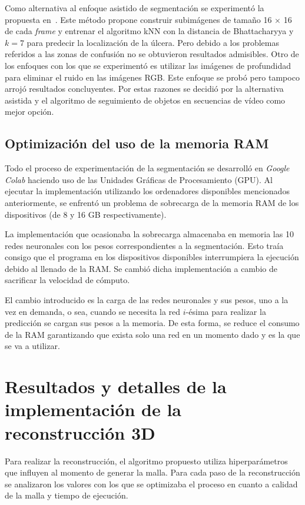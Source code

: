 Como alternativa al enfoque asistido de segmentación se experimentó la  propuesta en~\cite{filko2018wound}. Este método propone construir subimágenes de tamaño 16 $\times$ 16 de cada \textit{frame} y entrenar el algoritmo kNN con la distancia de Bhattacharyya y $k = 7$ para predecir la localización de la úlcera. Pero debido a los problemas referidos a las zonas de confusión no se obtuvieron resultados admisibles. Otro de los enfoques con los que se experimentó es utilizar las imágenes de profundidad para eliminar el ruido en las imágenes RGB. Este enfoque se probó pero tampoco arrojó resultados concluyentes. Por estas razones se decidió por la alternativa asistida y el algoritmo de seguimiento de objetos en secuencias de vídeo como mejor opción.

\subsection{Optimización del uso de la memoria RAM}

Todo el proceso de experimentación de la segmentación se desarrolló en \textit{Google Colab} haciendo uso de las Unidades Gráficas de Procesamiento (GPU). Al ejecutar la implementación utilizando los ordenadores disponibles mencionados anteriormente, se enfrentó un problema de sobrecarga de la memoria RAM de los dispositivos (de 8 y 16 GB respectivamente).

La implementación que ocasionaba la sobrecarga almacenaba en memoria las 10 redes neuronales con los pesos correspondientes a la segmentación. Esto traía consigo que el programa en los dispositivos disponibles interrumpiera la ejecución debido al llenado de la RAM. Se cambió dicha implementación a cambio de sacrificar la velocidad de cómputo.

El cambio introducido es la carga de las redes neuronales y sus pesos, uno a la vez en demanda, o sea, cuando se necesita la red $i$-ésima para realizar la predicción se cargan sus pesos a la memoria. De esta forma, se reduce el consumo de la RAM garantizando que exista solo una red en un momento dado y es la que se va a utilizar.

\section{Resultados y detalles de la implementación de la reconstrucción 3D}\label{sec:resRec3d}

Para realizar la reconstrucción, el algoritmo propuesto utiliza hiperparámetros que influyen al momento de generar la malla. Para cada paso de la reconstrucción se analizaron los valores con los que se optimizaba el proceso en cuanto a calidad de la malla y tiempo de ejecución.

